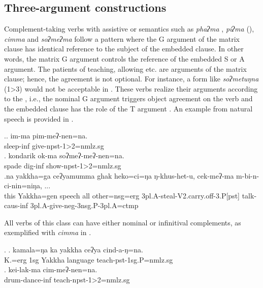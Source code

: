 \subsection{Three-argument constructions}	
		
 Complement-taking  verbs with assistive or  semantics such as \emph{phaʔma} , \emph{piʔma}  (), \emph{cimma}  and \emph{soʔmeʔma}  follow a pattern where the G argument of the matrix clause has identical reference to the subject of the embedded clause. In other words, the matrix G argument controls the reference of the embedded S or A argument. The patients of teaching, allowing etc. are arguments of the  matrix clause; hence, the agreement is not optional. For instance, a form like \emph{soʔmetuŋna} (1>3) would not be acceptable in \Next[b]. 
 These verbs realize their arguments according to the , i.e., the nominal G argument triggers object agreement on the verb and the embedded clause has the role of the T argument \Next. An example from natural speech is provided in \Next[c]. 
 

\ex.\ag. im-ma pim-meʔ-nen=na.\\
	sleep-{\sc inf} give-{\sc npst-1>2=nmlz.sg}\\
	\bg. kondarik ok-ma soʔmeʔ-meʔ-nen=na.\\
	spade dig{\sc -inf} show{\sc -npst-1>2=nmlz.sg}\\
	\bg.na   yakkha=ga ceʔyamumma ghak     heko=ci=ŋa      ŋ-khus-het-u, cek-meʔ-ma m-bi-n-ci-nin=niŋa,  ...\\
this Yakkha{\sc =gen}  speech all other{\sc =nsg=erg} {\sc 3pl.A-}steal{\sc -V2.carry.off-3.P[pst]} talk{\sc -caus-inf} {\sc 3pl.A-}give{\sc -neg-3nsg.P-3pl.A=ctmp}\\
 
	
	
All verbs of this class can have either nominal or infinitival complements, as exemplified with \emph{cimma}  in \Next.

\ex. \ag. kamala=ŋa ka yakkha ceʔya cind-a-ŋ=na.\\
		K.{\sc =erg} {\sc 1sg} Yakkha language teach{\sc [3sg.A]-pst-1sg.P=nmlz.sg}	\\
 	\bg. kei-lak-ma cim-meʔ-nen=na.\\
	drum-dance-{\sc inf} teach{\sc -npst-1>2=nmlz.sg}\\

